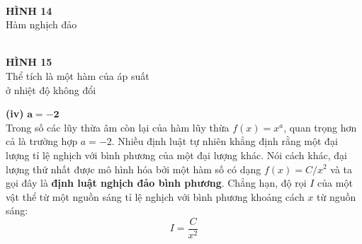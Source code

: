 \begin{minipage}[t]{0.708\textwidth}
\begin{center}
\begin{minipage}[t]{0.47\linewidth}
\\[4pt]
        \textbf{\textsf{HÌNH 14}}\\[1pt]
        {\fontsize{8.5pt}{11pt}\selectfont\textsf{Hàm nghịch đảo}}
    \end{minipage}\hfill
    \begin{minipage}[t]{0.47\linewidth}
        \centering
        \\[4pt]
        \textbf{\textsf{HÌNH 15}}\\[1pt]
        {\fontsize{8.5pt}{11pt}\selectfont\textsf{Thể tích là một hàm của áp suất}\\\textsf{ở nhiệt độ không đổi}}
    \end{minipage}
    \end{center}

    \vspace{0.8em}
    \noindent
    \textbf{\textsf{\color{stewartcyan}(iv)}} $\boldsymbol{a = -2}$\\[0.2em]
    Trong số các lũy thừa âm còn lại của hàm lũy thừa $f(x) = x^a$, quan trọng hơn cả là trường hợp $a = -2$. Nhiều định luật tự nhiên khẳng định rằng một đại lượng tỉ lệ nghịch với bình phương của một đại lượng khác. Nói cách khác, đại lượng thứ nhất được mô hình hóa bởi một hàm số có dạng $f(x) = C/x^2$ và ta gọi đây là \textbf{định luật nghịch đảo bình phương}. Chẳng hạn, độ rọi $I$ của một vật thể từ một nguồn sáng tỉ lệ nghịch với bình phương khoảng cách $x$ từ nguồn sáng:
    \[
    I = \frac{C}{x^2}
    \]
\end{minipage}